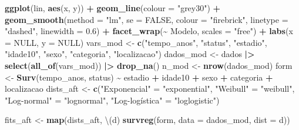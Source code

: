 \documentclass[
  brazilian,
]{article}
\newenvironment{Shaded}{\begin{snugshade}}{\end{snugshade}}
\newcommand{\AttributeTok}[1]{\textcolor[rgb]{0.13,0.29,0.53}{#1}}
\newcommand{\ConstantTok}[1]{\textcolor[rgb]{0.56,0.35,0.01}{#1}}
\newcommand{\FloatTok}[1]{\textcolor[rgb]{0.00,0.00,0.81}{#1}}
\newcommand{\FunctionTok}[1]{\textcolor[rgb]{0.13,0.29,0.53}{\textbf{#1}}}
\newcommand{\NormalTok}[1]{#1}
\newcommand{\OtherTok}[1]{\textcolor[rgb]{0.56,0.35,0.01}{#1}}
\newcommand{\SpecialCharTok}[1]{\textcolor[rgb]{0.81,0.36,0.00}{\textbf{#1}}}
\newcommand{\StringTok}[1]{\textcolor[rgb]{0.31,0.60,0.02}{#1}}
\begin{document}
\begin{Shaded}
\begin{Highlighting}[]
\FunctionTok{ggplot}\NormalTok{(lin, }\FunctionTok{aes}\NormalTok{(x, y)) }\SpecialCharTok{+}
  \FunctionTok{geom\_line}\NormalTok{(}\AttributeTok{colour =} \StringTok{"grey30"}\NormalTok{) }\SpecialCharTok{+}
  \FunctionTok{geom\_smooth}\NormalTok{(}\AttributeTok{method =} \StringTok{"lm"}\NormalTok{, }\AttributeTok{se =} \ConstantTok{FALSE}\NormalTok{, }\AttributeTok{colour =} \StringTok{"firebrick"}\NormalTok{, }\AttributeTok{linetype =} \StringTok{"dashed"}\NormalTok{, }\AttributeTok{linewidth =} \FloatTok{0.6}\NormalTok{) }\SpecialCharTok{+}
  \FunctionTok{facet\_wrap}\NormalTok{(}\SpecialCharTok{\textasciitilde{}}\NormalTok{ Modelo, }\AttributeTok{scales =} \StringTok{"free"}\NormalTok{) }\SpecialCharTok{+}
  \FunctionTok{labs}\NormalTok{(}\AttributeTok{x =} \ConstantTok{NULL}\NormalTok{, }\AttributeTok{y =} \ConstantTok{NULL}\NormalTok{)}
\NormalTok{vars\_mod  }\OtherTok{\textless{}{-}} \FunctionTok{c}\NormalTok{(}\StringTok{"tempo\_anos"}\NormalTok{, }\StringTok{"status"}\NormalTok{, }\StringTok{"estadio"}\NormalTok{, }\StringTok{"idade10"}\NormalTok{, }\StringTok{"sexo"}\NormalTok{, }\StringTok{"categoria"}\NormalTok{, }\StringTok{"localizacao"}\NormalTok{)}
\NormalTok{dados\_mod }\OtherTok{\textless{}{-}}\NormalTok{ dados }\SpecialCharTok{|\textgreater{}} \FunctionTok{select}\NormalTok{(}\FunctionTok{all\_of}\NormalTok{(vars\_mod)) }\SpecialCharTok{|\textgreater{}} \FunctionTok{drop\_na}\NormalTok{()}
\NormalTok{n\_mod     }\OtherTok{\textless{}{-}} \FunctionTok{nrow}\NormalTok{(dados\_mod)}
\NormalTok{form      }\OtherTok{\textless{}{-}} \FunctionTok{Surv}\NormalTok{(tempo\_anos, status) }\SpecialCharTok{\textasciitilde{}}\NormalTok{ estadio }\SpecialCharTok{+}\NormalTok{ idade10 }\SpecialCharTok{+}\NormalTok{ sexo }\SpecialCharTok{+}\NormalTok{ categoria }\SpecialCharTok{+}\NormalTok{ localizacao}
\NormalTok{dists\_aft }\OtherTok{\textless{}{-}} \FunctionTok{c}\NormalTok{(}\StringTok{"Exponencial"} \OtherTok{=} \StringTok{"exponential"}\NormalTok{, }\StringTok{"Weibull"} \OtherTok{=} \StringTok{"weibull"}\NormalTok{,}
               \StringTok{"Log{-}normal"} \OtherTok{=} \StringTok{"lognormal"}\NormalTok{, }\StringTok{"Log{-}logística"} \OtherTok{=} \StringTok{"loglogistic"}\NormalTok{)}

\NormalTok{fits\_aft }\OtherTok{\textless{}{-}} \FunctionTok{map}\NormalTok{(dists\_aft, \textbackslash{}(d) }\FunctionTok{survreg}\NormalTok{(form, }\AttributeTok{data =}\NormalTok{ dados\_mod, }\AttributeTok{dist =}\NormalTok{ d))}


\end{Highlighting}
\end{Shaded}
\end{document}
